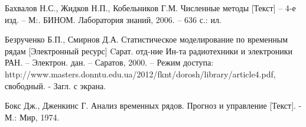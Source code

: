 \newpage


\begin{references}
	\item\label{ref:num-methods} Бахвалов Н.С., Жидков Н.П., Кобельников Г.М.
	Численные методы [Текст] – 4-е изд. – М:. БИНОМ. Лаборатория
	знаний, 2006. – 636 с.: ил.
	\item Безрученко Б.П., Смирнов Д.А.
	Статистическое моделирование по временным рядам [Электронный ресурс]
	Cарат. отд-ние Ин-та радиотехники и электроники РАН.
	– Электрон. дан. – Саратов, 2000. – Режим доступа:
	http://www.masters.donntu.edu.ua/2012/fknt/dorosh/library/article4.pdf,
	свободный. - Загл. с экрана.
	\item\label{ref:time-series-analysis} Бокс Дж., Дженкинс Г. Анализ временных рядов.
	Прогноз и управление [Текст]. - М.: Мир, 1974.
\end{references}
